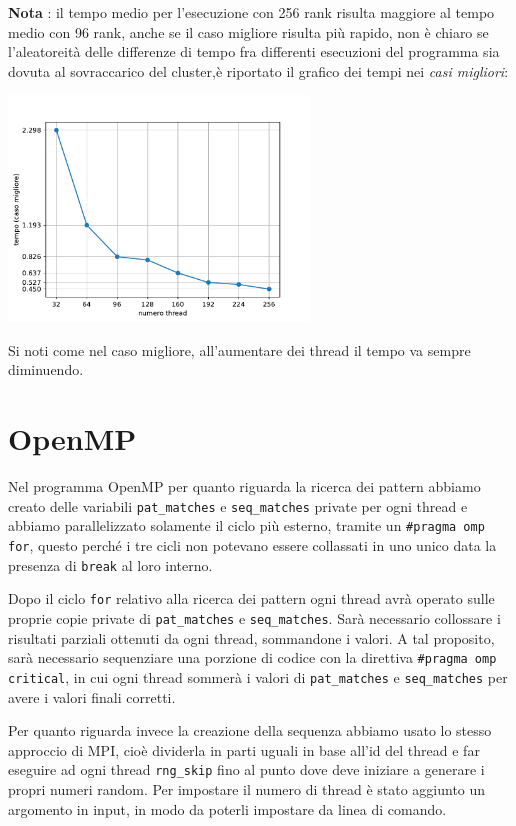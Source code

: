 \documentclass[12pt,openany]{report}
\begin{document}
\textbf{Nota} : il tempo medio per l'esecuzione con 256 rank risulta maggiore al tempo medio con 96 rank, anche se il caso migliore risulta più rapido, non è chiaro se l'aleatoreità delle differenze di tempo fra differenti esecuzioni del programma sia dovuta al sovraccarico del cluster,è riportato il grafico dei tempi nei \textit{casi migliori}:
\begin{center}
    \includegraphics[width=0.6\textwidth ]{images/tempi_MPI_bestcase.pdf}
\end{center}
Si noti come nel caso migliore, all'aumentare dei thread il tempo va sempre diminuendo.



\newpage
\section{OpenMP}
Nel programma OpenMP per quanto riguarda la ricerca dei pattern abbiamo creato delle variabili \texttt{pat\_matches} e \texttt{seq\_matches} private per ogni thread e abbiamo parallelizzato solamente il ciclo più esterno, tramite un \texttt{\#pragma omp for}, questo perché i tre cicli non potevano essere collassati in uno unico data la presenza di \texttt{break} al loro interno.
\bigskip

Dopo il ciclo \texttt{for} relativo alla ricerca dei pattern ogni thread avrà operato sulle proprie copie private di \texttt{pat\_matches} e \texttt{seq\_matches}. Sarà necessario collossare i risultati parziali ottenuti da ogni thread, sommandone i valori.
A tal proposito, sarà necessario sequenziare una porzione di codice con la direttiva \texttt{\#pragma omp critical}, in cui ogni thread sommerà i valori di \texttt{pat\_matches} e \texttt{seq\_matches} per avere i valori finali corretti.\bigskip

Per quanto riguarda invece la creazione della sequenza abbiamo usato lo stesso approccio di MPI, cioè dividerla in parti uguali in base all'id del thread e far eseguire ad ogni thread \texttt{rng\_skip} fino al punto dove deve iniziare a generare i propri numeri random. Per impostare il numero di thread è stato aggiunto un argomento in input, in modo da poterli impostare da linea di comando.\bigskip
\end{document}
